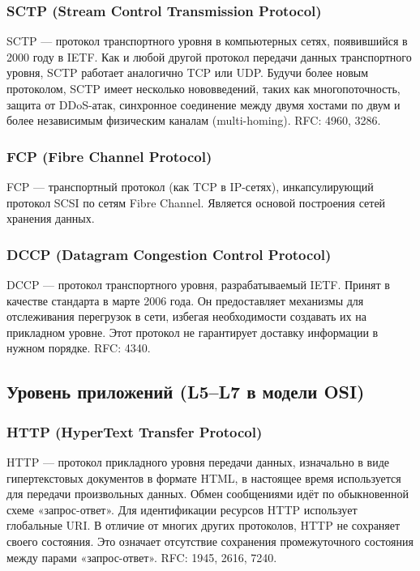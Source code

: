 \subsubsection{SCTP (Stream Control Transmission Protocol)}
SCTP — протокол транспортного уровня в компьютерных сетях, появившийся в 2000 году в
IETF. Как и любой другой протокол передачи данных транспортного уровня, SCTP работает
аналогично TCP или UDP. Будучи более новым протоколом, SCTP имеет несколько
нововведений, таких как многопоточность, защита от DDoS-атак, синхронное соединение между
двумя хостами по двум и более независимым физическим каналам (multi-homing).
RFC: 4960, 3286.

\subsubsection{FCP (Fibre Channel Protocol)}
FCP — транспортный протокол (как TCP в IP-сетях), инкапсулирующий протокол SCSI по
сетям Fibre Channel. Является основой построения сетей хранения данных.

\subsubsection{DCCP (Datagram Congestion Control Protocol)}
DCCP — протокол транспортного уровня, разрабатываемый IETF. Принят в качестве
стандарта в марте 2006 года. Он предоставляет механизмы для отслеживания перегрузок в
сети, избегая необходимости создавать их на прикладном уровне. Этот протокол не гарантирует
доставку информации в нужном порядке. RFC: 4340.

\subsection{Уровень приложений (L5--L7 в модели OSI)}

\subsubsection{HTTP (HyperText Transfer Protocol)}
HTTP — протокол прикладного уровня передачи данных, изначально в виде гипертекстовых
документов в формате HTML, в настоящее время используется для передачи произвольных
данных. Обмен сообщениями идёт по обыкновенной схеме «запрос-ответ». Для идентификации
ресурсов HTTP использует глобальные URI. В отличие от многих других протоколов, HTTP не
сохраняет своего состояния. Это означает отсутствие сохранения промежуточного состояния
между парами «запрос-ответ». RFC: 1945, 2616, 7240.

